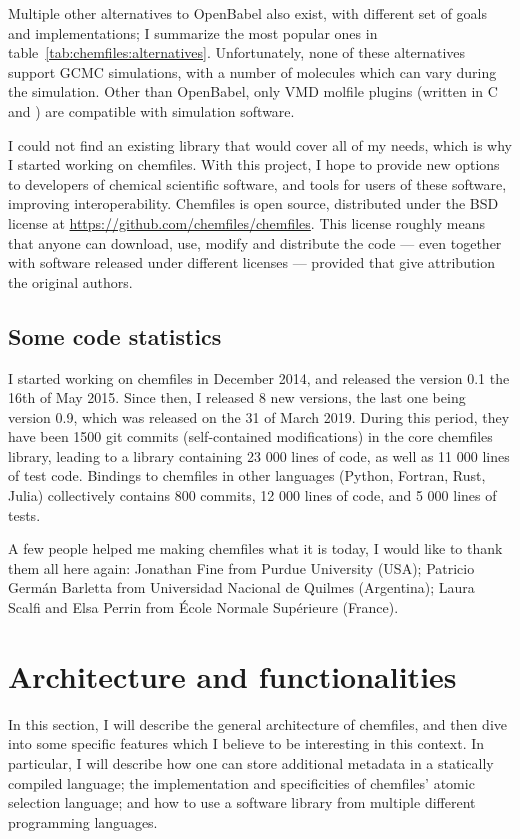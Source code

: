 \documentclass[thesis]{subfiles}
\begin{document}
Multiple other alternatives to OpenBabel also exist, with different set of
goals and implementations; I summarize the most popular ones in
table~\ref{tab:chemfiles:alternatives}. Unfortunately, none of these
alternatives support GCMC simulations, with a number of molecules which can vary
during the simulation. Other than OpenBabel, only VMD molfile plugins (written
in C and \cxx) are compatible with \cxx simulation software.

I could not find an existing library that would cover all of my needs, which is
why I started working on chemfiles. With this project, I hope to provide new
options to developers of chemical scientific software, and tools for users of
these software, improving interoperability. Chemfiles is open source, distributed
under the BSD license at \url{https://github.com/chemfiles/chemfiles}. This
license roughly means that anyone can download, use, modify and distribute the
code --- even together with software released under different licenses ---
provided that give attribution the original authors.

\subsection{Some code statistics}

I started working on chemfiles in December 2014, and released the version 0.1
the 16th of May 2015. Since then, I released 8 new versions, the last one being
version 0.9, which was released on the 31 of March 2019. During this period,
they have been 1500 git commits (self-contained modifications) in the core \cxx
chemfiles library, leading to a library containing 23 000 lines of code, as well
as 11 000 lines of test code. Bindings to chemfiles in other languages (Python,
Fortran, Rust, Julia) collectively contains 800 commits, 12 000 lines of code,
and 5 000 lines of tests.

A few people helped me making chemfiles what it is today, I would like to thank
them all here again: Jonathan Fine from Purdue University (USA); Patricio Germán
Barletta from Universidad Nacional de Quilmes (Argentina); Laura Scalfi and Elsa
Perrin from École Normale Supérieure (France).

\section{Architecture and functionalities}

In this section, I will describe the general architecture of chemfiles, and then
dive into some specific features which I believe to be interesting in this
context. In particular, I will describe how one can store additional metadata in
a statically compiled language; the implementation and specificities of chemfiles'
atomic selection language; and how to use a software library from multiple
different programming languages.
\end{document}
